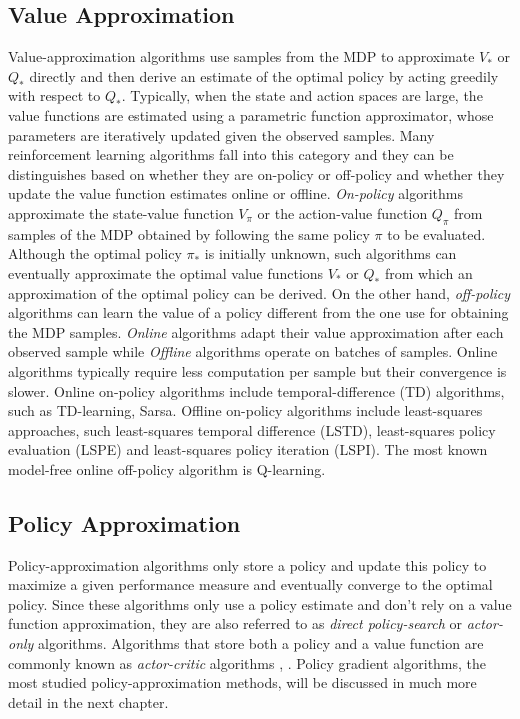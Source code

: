 \subsection{Value Approximation}
Value-approximation algorithms use samples from the MDP to approximate $V_*$ or $Q_*$ directly and then derive an estimate of the optimal policy by acting greedily with respect to $Q_*$. Typically, when the state and action spaces are large, the value functions are estimated using a parametric function approximator, whose parameters are iteratively updated given the observed samples. Many reinforcement learning algorithms fall into this category and they can be distinguishes based on whether they are on-policy or off-policy and whether they update the value function estimates online or offline. \emph{On-policy} algorithms approximate the state-value function $V_\pi$ or the action-value function $Q_\pi$ from samples of the MDP obtained by following the same policy $\pi$ to be evaluated. Although the optimal policy $\pi_*$ is initially unknown, such algorithms can eventually approximate the optimal value functions $V_*$ or $Q_*$ from which an approximation of the optimal policy can be derived. On the other hand, \emph{off-policy} algorithms can learn the value of a policy different from the one use for obtaining the MDP samples. \emph{Online} algorithms adapt their value approximation after each observed sample while \emph{Offline} algorithms operate on batches of samples. Online algorithms typically require less computation per sample but their convergence is slower. Online on-policy algorithms include temporal-difference (TD) algorithms, such as TD-learning, Sarsa. Offline on-policy algorithms include least-squares approaches, such least-squares temporal difference (LSTD), least-squares policy evaluation (LSPE) and least-squares policy iteration (LSPI). The most known model-free online off-policy algorithm is Q-learning.

\subsection{Policy Approximation}
Policy-approximation algorithms only store a policy and update this policy to maximize a given performance measure and eventually converge to the optimal policy. Since these algorithms only use a policy estimate and don't rely on a value function approximation, they are also referred to as \emph{direct policy-search} or \emph{actor-only} algorithms. Algorithms that store both a policy and a value function are commonly known as \emph{actor-critic} algorithms \cite{sutton1999policy}, \cite{konda1999actor}. Policy gradient algorithms, the most studied policy-approximation methods, will be discussed in much more detail in the next chapter. 





